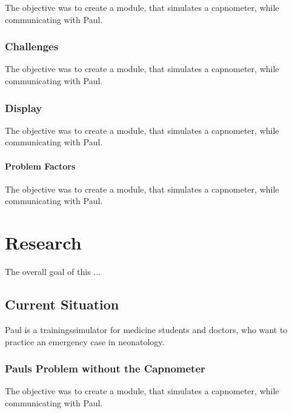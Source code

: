 \documentclass[12pt]{article}
\begin{document}
The objective was to create a module, that simulates a capnometer, while communicating
with Paul.


\subsubsection{Challenges}

The objective was to create a module, that simulates a capnometer, while communicating
with Paul.


\subsubsection{Display}

The objective was to create a module, that simulates a capnometer, while communicating
with Paul.


\paragraph{Problem Factors}

The objective was to create a module, that simulates a capnometer, while communicating
with Paul.


\clearpage



\section{Research}

The overall goal of this ...


\subsection{Current Situation}

Paul is a trainingssimulator for medicine students and doctors, who want to practice
an emergency case in neonatology.


\subsubsection{Pauls Problem without the Capnometer}

The objective was to create a module, that simulates a capnometer, while communicating
with Paul.
\end{document}
